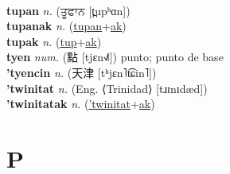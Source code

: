  \label{tupel} \\
\textbf{tupan} \textit{n.} ({\gurmukhi{}ਤੂਫਾਨ} [t̪upʰɑn])
 \label{tupan} \\
\textbf{tupanak} \textit{n.} (\hyperref[tupan]{tupan}+\hyperref[ak]{ak})
 \label{tupanak} \\
\textbf{tupak} \textit{n.} (\hyperref[tup]{tup}+\hyperref[ak]{ak})
 \label{tupak} \\
\textbf{tyen} \textit{num.} ({\chinese{}點} [tjɛn˧˩˥])
punto; punto de base \label{tyen} \\
\textbf{'tyencin} \textit{n.} ({\chinese{}天津} [tʰjɛn˥t͡ɕin˥])
 \label{'tyencin} \\
\textbf{'twinitat} \textit{n.} (Eng. ⟨Trinidad⟩ [tɹɪnɪdæd])
 \label{'twinitat} \\
\textbf{'twinitatak} \textit{n.} (\hyperref['twinitat]{'twinitat}+\hyperref[ak]{ak})
 \label{'twinitatak} 

\section{P}

